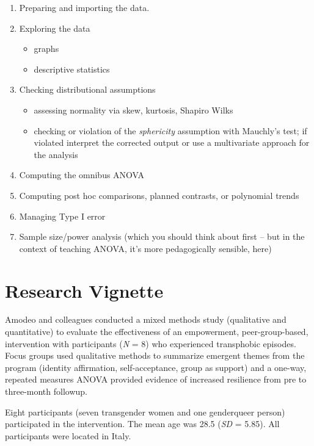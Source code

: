 \documentclass[
  11pt,
]{book}
\providecommand{\tightlist}{%
  \setlength{\itemsep}{0pt}\setlength{\parskip}{0pt}}
\begin{document}
\begin{enumerate}
\def\labelenumi{\arabic{enumi}.}
\tightlist
\item
  Preparing and importing the data.
\item
  Exploring the data

  \begin{itemize}
  \tightlist
  \item
    graphs
  \item
    descriptive statistics
  \end{itemize}
\item
  Checking distributional assumptions

  \begin{itemize}
  \tightlist
  \item
    assessing normality via skew, kurtosis, Shapiro Wilks
  \item
    checking or violation of the \emph{sphericity} assumption with Mauchly's test; if violated interpret the corrected output or use a multivariate approach for the analysis
  \end{itemize}
\item
  Computing the omnibus ANOVA
\item
  Computing post hoc comparisons, planned contrasts, or polynomial trends
\item
  Managing Type I error
\item
  Sample size/power analysis (which you should think about first -- but in the context of teaching ANOVA, it's more pedagogically sensible, here)
\end{enumerate}

\hypertarget{research-vignette-6}{%
\section{Research Vignette}\label{research-vignette-6}}

Amodeo \citep{amodeo_empowering_2018} and colleagues conducted a mixed methods study (qualitative and quantitative) to evaluate the effectiveness of an empowerment, peer-group-based, intervention with participants (\emph{N} = 8) who experienced transphobic episodes. Focus groups used qualitative methods to summarize emergent themes from the program (identity affirmation, self-acceptance, group as support) and a one-way, repeated measures ANOVA provided evidence of increased resilience from pre to three-month followup.

Eight participants (seven transgender women and one genderqueer person) participated in the intervention. The mean age was 28.5 (\emph{SD} = 5.85). All participants were located in Italy.
\end{document}
